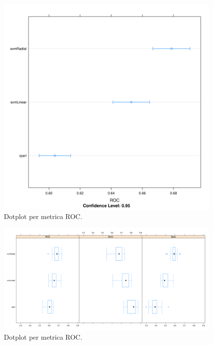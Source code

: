 \begin{figure}[H]
	\centering
	\includegraphics[width=13cm]{../images/compare_dot_plot.png}
	\caption{Dotplot per metrica ROC.}
	\label{fig:compare_dot_plot}
\end{figure}

\begin{figure}[H]
	\centering
	\includegraphics[width=13cm]{../images/compare_bw_plot.png}
	\caption{Dotplot per metrica ROC.}
	\label{fig:compare_bw_plot}
\end{figure}

